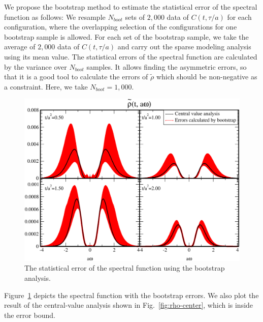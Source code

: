 \documentclass[a4paper,11pt]{article}
\begin{document}
We propose the bootstrap method to estimate the statistical error of the spectral function as follows: 
We resample $N_{boot}$ sets of $2,000$ data of $C(t,\tau/a)$ for each configuration, where the overlapping selection of the configurations for one bootstrap sample is allowed.
For each set of the bootstrap sample, we take the average of $2,000$ data of $C(t, \tau/a)$ and carry out the sparse modeling analysis using its mean value.
The statistical errors of the spectral function are calculated by the variance over $N_{boot}$ samples.
It allows finding the asymmetric errors, so that it is a good tool to calculate the errors of $\tilde{\rho}$ which should be non-negative as a constraint.
Here, we take $N_{boot}=1,000$.


\begin{figure}[h]
\begin{center}
\includegraphics[scale=0.45]{./rho-with-booterror.pdf}
\caption{The statistical error of the spectral function using the bootstrap analysis. }
\label{fig:rho-errors}
\end{center}
\end{figure}
Figure~\ref{fig:rho-errors} depicts the spectral function with the bootstrap errors.
We also plot the result of the central-value analysis shown in Fig.~\ref{fig:rho-center}, which is inside the error bound.
\end{document}

